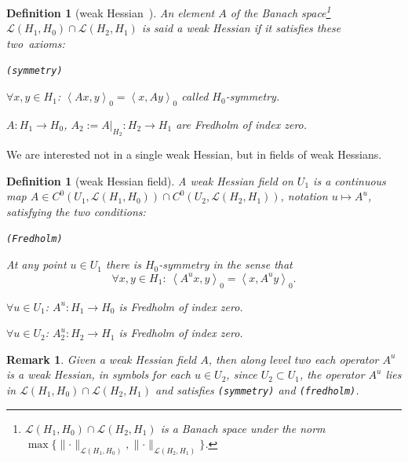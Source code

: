 \documentclass[pdftex]{sigma}
\numberwithin{equation}{section}
\newtheorem{Definition}[Theorem]{Definition}
\newtheorem{Remark}[Theorem]{Remark}
\newcommand{\Ll}{{\mathcal{L}}} %
\newcommand{\norm}{{\rm norm}}
\newcommand{\INNER}[2]{\left\langle #1, #2\right\rangle}
\def\norm#1{\mathopen\|#1\mathclose\|}
\newcommand{\1}{{{\mathchoice {\rm 1\mskip-4mu l} {\rm 1\mskip-4mu l}
{\rm 1\mskip-4.5mu l} {\rm 1\mskip-5mu l}}}}
\begin{document}
\begin{Definition}[weak Hessian~\cite{Frauenfelder:2024c}]
An element $A$ of the Banach space\footnote{
 $\Ll(H_1,H_0)\cap \Ll(H_2,H_1)$ is a Banach space under the norm
 $\max\bigl\{\norm{\cdot}_{\Ll(H_1,H_0)},\norm{\cdot}_{\Ll(H_2,H_1)}\bigr\}$.
 }
$\Ll(H_1,H_0)\cap \Ll(H_2,H_1)$ is said a \textit{weak Hessian}
if it satisfies these two~axioms:
\begin{labeling}{\texttt{(symmetry)}}\itemsep=0pt
\item[\texttt{(symmetry)}]
 $\forall x,y\in H_1$: $\INNER{A x}{y}_0=\INNER{x}{A y}_0$
 called \textit{$H_0$-symmetry}.
\item[\texttt{(fredholm)}]
 $A\colon H_1\to H_0$,
 $A_2:=A|_{H_2}\colon H_2\to H_1$
 are Fredholm of index zero.
\end{labeling}
\end{Definition}

We are interested not in a single weak Hessian, but in fields of weak Hessians.

\begin{Definition}[weak Hessian field]\label{def:weak-Hessian-field}
A \textit{weak Hessian field} on $U_1$ is a continuous map
$A\in C^0(U_1,\Ll(H_1,H_0)) \cap C^0(U_2,\Ll(H_2,H_1))$,
notation $u\mapsto A^u$, satisfying the two conditions:
\begin{labeling}{\texttt{(Fredholm)}}\itemsep=0pt
\item[\texttt{(Symmetry)}]
 At any point $u\in U_1$ there is $H_0$-symmetry in the sense that
 \begin{equation}\label{eq:u-0-symmetric}
 \forall x,y\in H_1\colon \
 \INNER{A^u x}{y}_0=\INNER{x}{A^u y}_0 .
 \end{equation}
\item[\texttt{(Fredholm)}]
 $\forall u\in U_1$:
 $A^u\colon H_1\to H_0$ is Fredholm of index zero.

 $\forall u\in U_2$:
 $A^u_2\colon H_2\to H_1$ is Fredholm of index zero.
\end{labeling}
\end{Definition}

\begin{Remark}
Given a weak Hessian field $A$, then along level two
each operator $A^u$ is a weak Hessian, in symbols for each $u\in U_2$,
since $U_2\subset U_1$, the operator $A^u$ lies in
$\Ll(H_1,H_0)\cap \Ll(H_2,H_1)$ and satisfies \texttt{(symmetry)}
and \texttt{(fredholm)}.
\end{Remark}
\end{document}
